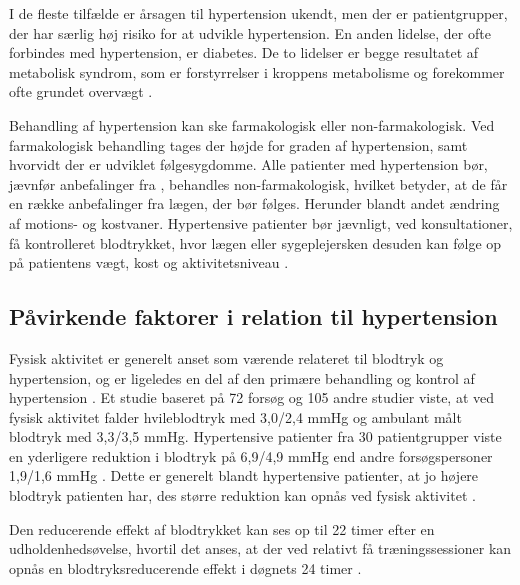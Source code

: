 
I de fleste tilfælde er årsagen til hypertension ukendt, men der er patientgrupper, der har særlig høj risiko for at udvikle hypertension. En anden lidelse, der ofte forbindes med hypertension, er diabetes. De to lidelser er begge resultatet af metabolisk syndrom, som er forstyrrelser i kroppens metabolisme og forekommer ofte grundet overvægt \cite{cheung2012}.

Behandling af hypertension kan ske farmakologisk eller non-farmakologisk. Ved farmakologisk behandling tages der højde for graden af hypertension, samt hvorvidt der er udviklet følgesygdomme. Alle patienter med hypertension bør, jævnfør anbefalinger fra \citeauthor{bech2015}, behandles non-farmakologisk, hvilket betyder, at de får en række anbefalinger fra lægen, der bør følges. Herunder blandt andet ændring af motions- og kostvaner. Hypertensive patienter bør jævnligt, ved konsultationer, få kontrolleret blodtrykket, hvor lægen eller sygeplejersken desuden kan følge op på patientens vægt, kost og aktivitetsniveau \cite{lodberg2016, bech2015}. 

\subsection{Påvirkende faktorer i relation til hypertension}

Fysisk aktivitet er generelt anset som værende relateret til blodtryk og hypertension, og er ligeledes en del af den primære behandling og kontrol af hypertension \citep{pescatello2004, fagard2006}.
Et studie baseret på 72 forsøg og 105 andre studier viste, at ved fysisk aktivitet falder hvileblodtryk med 3,0/2,4 mmHg og ambulant målt blodtryk med 3,3/3,5 mmHg. 
Hypertensive patienter fra 30 patientgrupper viste en yderligere reduktion i blodtryk på 6,9/4,9 mmHg end andre forsøgspersoner 1,9/1,6 mmHg \citep{fagard2006}. 
Dette er generelt blandt hypertensive patienter, at jo højere blodtryk patienten har, des større reduktion kan opnås ved fysisk aktivitet \citep{pedersen2011, pescatello2004}.

Den reducerende effekt af blodtrykket kan ses op til 22 timer efter en udholdenhedsøvelse, hvortil det anses, at der ved relativt få træningssessioner kan opnås en blodtryksreducerende effekt i døgnets 24 timer \citep{pescatello2004}.


